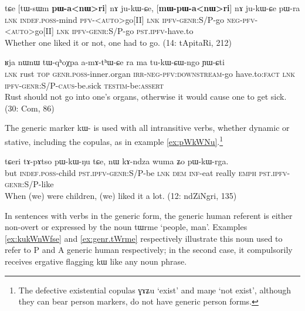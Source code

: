 \documentclass[oldfontcommands,oneside,a4paper,11pt]{article}
\newcommand{\ipa}[1]{{\phon \mbox{#1}}} %
\begin{document}
\begin{exe}
\ex  \label{ex:pannWri}
\gll
\ipa{tɕe}  	[\ipa{tɯ-sɯm}  	\textbf{\ipa{pɯ-a<nɯ>ri}}]  	\ipa{nɤ}  	\ipa{ju-kɯ-ɕe,}  	[\textbf{\ipa{mɯ-pɯ-a<nɯ>ri}}]  	\ipa{nɤ}  	\ipa{ju-kɯ-ɕe}  	\ipa{pɯ-ra}  \\
\textsc{lnk} \textsc{indef.poss}-mind  \textsc{pfv-<auto>}go[II] \textsc{lnk} \textsc{ipfv-genr}:S/P-go \textsc{neg-pfv-<auto>}go[II] \textsc{lnk} \textsc{ipfv-genr}:S/P-go \textsc{pst.ipfv}-have.to \\
\glt Whether one liked it or not, one had to go. (14: tApitaRi, 212)
\end{exe}


\begin{exe}
\ex \label{ex:tukWCWngo}
\gll  \ipa{tɕe} 	\ipa{ʁja} 	\ipa{nɯnɯ} 	\ipa{tɯ-qʰoχpa} 	\ipa{a-mɤ-tʰɯ-ɕe} 	\ipa{ra} 	\ipa{ma} 	\ipa{tu-kɯ-ɕɯ-ngo} 	\ipa{ɲɯ-ɕti} \\
\textsc{lnk} rust \textsc{top} \textsc{genr.poss}-inner.organ \textsc{irr-neg-pfv:downstream}-go have.to:\textsc{fact} \textsc{lnk} \textsc{ipfv-genr:S/P-caus}-be.sick  \textsc{testim}-be:\textsc{assert} \\
\glt Rust should not go into one's organs, otherwise it would cause one to get sick. (30: Com, 86)
\end{exe}

The generic marker \ipa{kɯ-} is used with all intransitive verbs, whether dynamic or stative, including the copulas, as in example \ref{ex:pWkWNu}.\footnote{The defective existential copulas \ipa{ɣɤʑu} `exist' and \ipa{maŋe} `not exist', although they can bear person markers, do not have generic person forms. }

\begin{exe}
\ex \label{ex:pWkWNu}
\gll
\ipa{tɕeri} 	\ipa{tɤ-pɤtso} 	\ipa{pɯ-kɯ-ŋu} 	\ipa{tɕe,} 	\ipa{nɯ} 	\ipa{kɤ-ndza} 	\ipa{wuma} 	\ipa{ʑo} 	\ipa{pɯ-kɯ-rga.} \\
but \textsc{indef.poss}-child \textsc{pst.ipfv-genr}:S/P-be \textsc{lnk} \textsc{dem} \textsc{inf}-eat really \textsc{emph} \textsc{pst.ipfv-genr}:S/P-like \\
\glt When (we) were children, (we) liked it a lot. (12: ndZiNgri, 135)
\end{exe}

In sentences with verbs in the generic form, the generic  human referent is either non-overt or expressed by the noun \ipa{tɯrme} `people, man'. Examples \ref{ex:kukWnWfse} and \ref{ex:genr.tWrme} respectively illustrate this noun used to  refer to P and A generic human respectively; in the second case, it   compulsorily receives  ergative flagging \ipa{kɯ} like any   noun phrase.
\end{document}

